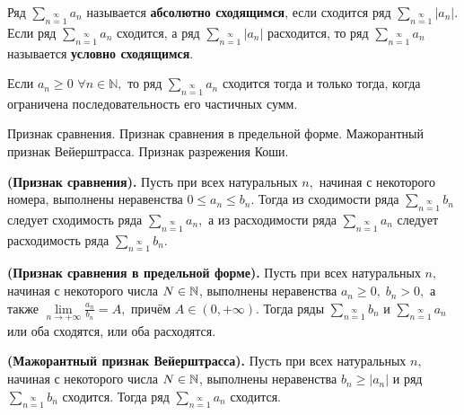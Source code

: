 \begin{definition}
	Ряд $\sum\limits_{n=1}\limits^{\infty}a_n$
	называется \textbf{абсолютно сходящимся},
	если сходится ряд
	$\sum\limits_{n=1}\limits^{\infty}|a_n|.$
	Если ряд $\sum\limits_{n=1}\limits^{\infty}a_n$
	сходится, а ряд
	$\sum\limits_{n=1}\limits^{\infty}|a_n|$
	расходится, то ряд
	$\sum\limits_{n=1}\limits^{\infty}a_n$
	называется \textbf{условно сходящимся}.
\end{definition}

\begin{lemma}
	Если $a_n\geq0$ $\forall n\in\mathbb{N},$
	то ряд $\sum\limits_{n=1}\limits^{\infty}a_n$
	сходится тогда и только тогда,
	когда ограничена последовательность его
	частичных сумм.
\end{lemma}

\newpage
\begin{problem}
Признак сравнения. Признак сравнения в предельной форме. Мажорантный признак
Вейерштрасса. Признак разрежения Коши.
\end{problem}

\begin{theorem} \textbf{(Признак сравнения).}
	Пусть при всех натуральных $n,$
	начиная с некоторого номера,
	выполнены неравенства $0\leq a_n
		\leq b_n.$ Тогда из сходимости
	ряда $\sum\limits_{n=1}\limits^{\infty}b_n$
	следует сходимость ряда
	$\sum\limits_{n=1}\limits^{\infty}a_n,$
	а из расходимости ряда
	$\sum\limits_{n=1}\limits^{\infty}a_n$
	следует расходимость ряда
	$\sum\limits_{n=1}\limits^{\infty}b_n.$
\end{theorem}

\begin{theorem} \textbf{(Признак сравнения в предельной форме).}
	Пусть при всех натуральных $n,$
	начиная с некоторого числа $N\in\mathbb{N}$,
	выполнены неравенства $a_n\geq0,\;b_n>0,$
	а также
	$\lim\limits_{n\rightarrow+\infty}\frac{a_n}{b_n}=A,$
	причём $A\in(0, +\infty).$
	Тогда ряды $\sum\limits_{n=1}\limits^{\infty}b_n$
	и $\sum\limits_{n=1}\limits^{\infty}a_n$
	или оба сходятся, или оба расходятся.
\end{theorem}

\begin{lemma} \textbf{(Мажорантный признак Вейерштрасса).}
	Пусть при всех натуральных $n,$
	начиная с некоторого числа $N\in\mathbb{N}$,
	выполнены неравенства $b_n\geq|a_n|$
	и ряд $\sum\limits_{n=1}\limits^{\infty}b_n$
	сходится. Тогда ряд
	$\sum\limits_{n=1}\limits^{\infty}a_n$
	сходится.
\end{lemma}


